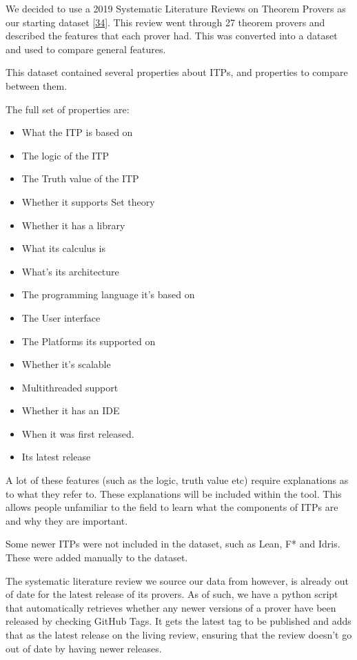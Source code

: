 \documentclass[
]{article}
\providecommand{\tightlist}{%
  \setlength{\itemsep}{0pt}\setlength{\parskip}{0pt}}
\begin{document}
We decided to use a 2019 Systematic Literature Reviews on Theorem
Provers as our starting dataset
{[}\protect\hyperlink{ref-nawaz_survey_2019}{34}{]}. This review went
through 27 theorem provers and described the features that each prover
had. This was converted into a dataset and used to compare general
features.

This dataset contained several properties about ITPs, and properties to
compare between them.

The full set of properties are:

\begin{itemize}
\tightlist
\item
  What the ITP is based on
\item
  The logic of the ITP
\item
  The Truth value of the ITP
\item
  Whether it supports Set theory
\item
  Whether it has a library
\item
  What its calculus is
\item
  What's its architecture
\item
  The programming language it's based on
\item
  The User interface
\item
  The Platforms its supported on
\item
  Whether it's scalable
\item
  Multithreaded support
\item
  Whether it has an IDE
\item
  When it was first released.
\item
  Its latest release
\end{itemize}

A lot of these features (such as the logic, truth value etc) require
explanations as to what they refer to. These explanations will be
included within the tool. This allows people unfamiliar to the field to
learn what the components of ITPs are and why they are important.

Some newer ITPs were not included in the dataset, such as Lean, F* and
Idris. These were added manually to the dataset.

The systematic literature review we source our data from however, is
already out of date for the latest release of its provers. As of such,
we have a python script that automatically retrieves whether any newer
versions of a prover have been released by checking GitHub Tags. It gets
the latest tag to be published and adds that as the latest release on
the living review, ensuring that the review doesn't go out of date by
having newer releases.
\end{document}
